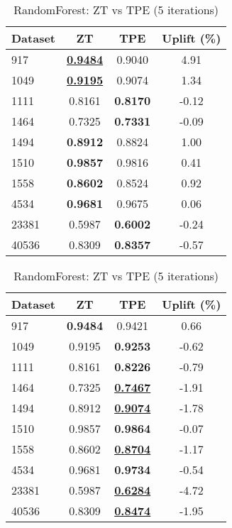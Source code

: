 \begin{table}[htbp]
\begin{center}
\begin{small}
\begin{sc}
\begin{subtable}[t]{0.48\textwidth}
    \centering
    \caption{RandomForest: ZT vs TPE (1 iteration)}
    \label{tab:randomforest-zt-vs-tpe-1}
    \begin{tabular}{lccc}
    \toprule
    \textbf{Dataset} & \textbf{ZT} & \textbf{TPE} & \textbf{Uplift (\%)} \\
    \midrule
    917    & \underline{\textbf{0.9484}} & 0.9040 & 4.91 \\
    1049    & \underline{\textbf{0.9195}} & 0.9074 & 1.34 \\
    1111    & 0.8161 & \textbf{0.8170} & -0.12 \\
    1464    & 0.7325 & \textbf{0.7331} & -0.09 \\
    1494    & \textbf{0.8912} & 0.8824 & 1.00 \\
    1510    & \textbf{0.9857} & 0.9816 & 0.41 \\
    1558    & \textbf{0.8602} & 0.8524 & 0.92 \\
    4534    & \textbf{0.9681} & 0.9675 & 0.06 \\
    23381    & 0.5987 & \textbf{0.6002} & -0.24 \\
    40536    & 0.8309 & \textbf{0.8357} & -0.57 \\
    \bottomrule
    \end{tabular}
\end{subtable}
\hfill
\begin{subtable}[t]{0.48\textwidth}
    \centering
    \caption{RandomForest: ZT vs TPE (5 iterations)}
    \label{tab:randomforest-zt-vs-tpe-5}
    \begin{tabular}{lccc}
    \toprule
    \textbf{Dataset} & \textbf{ZT} & \textbf{TPE} & \textbf{Uplift (\%)} \\
    \midrule
    917    & \textbf{0.9484} & 0.9421 & 0.66 \\
    1049    & 0.9195 & \textbf{0.9253} & -0.62 \\
    1111    & 0.8161 & \textbf{0.8226} & -0.79 \\
    1464    & 0.7325 & \underline{\textbf{0.7467}} & -1.91 \\
    1494    & 0.8912 & \underline{\textbf{0.9074}} & -1.78 \\
    1510    & 0.9857 & \textbf{0.9864} & -0.07 \\
    1558    & 0.8602 & \underline{\textbf{0.8704}} & -1.17 \\
    4534    & 0.9681 & \textbf{0.9734} & -0.54 \\
    23381    & 0.5987 & \underline{\textbf{0.6284}} & -4.72 \\
    40536    & 0.8309 & \underline{\textbf{0.8474}} & -1.95 \\
    \bottomrule
    \end{tabular}
\end{subtable}


\end{sc}
\end{small}
\end{center}
\end{table}
